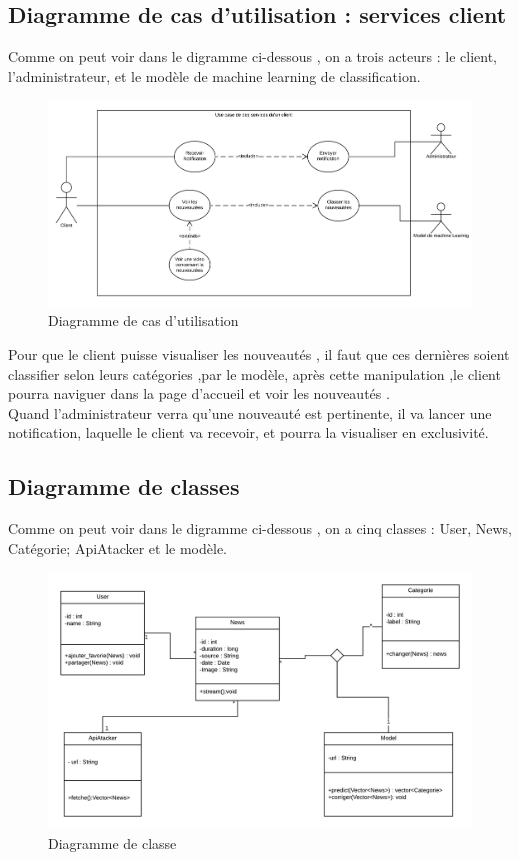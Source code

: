 \subsection{Diagramme de cas d’utilisation : services client}
Comme on peut voir dans le digramme ci-dessous , on a trois acteurs : le client, l'administrateur, et le modèle de machine learning de classification.\\[0.2cm]
\begin{figure}[h]
	\includegraphics[width=\linewidth]{Images/use_case_sanadtech.png}
	\caption{Diagramme de cas d'utilisation}
	\label{fig:cas-utilisation}
\end{figure}

Pour que le client puisse visualiser les nouveautés , il faut que ces dernières soient classifier selon leurs catégories ,par le modèle, après cette manipulation ,le client pourra naviguer dans la page d'accueil et voir les nouveautés .\\[0.2cm]
Quand l'administrateur verra qu'une nouveauté est pertinente, il va lancer une notification, laquelle le client va recevoir, et pourra la visualiser en exclusivité.

\subsection{Diagramme de classes}
Comme on peut voir dans le digramme ci-dessous , on a cinq classes : User, News, Catégorie; ApiAtacker et le modèle.\\[0.2cm]
\begin{figure}[H]
	\includegraphics[scale=0.5]{Images/Class_diagram.png}
	\caption{Diagramme de classe}
	\label{fig:classe1}
\end{figure}

